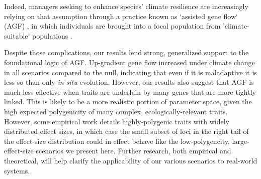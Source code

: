 \documentclass[9pt,twocolumn,twoside,lineno]{pnas-new}
\begin{document}
Indeed, managers seeking to enhance species' climate resilience
are increasingly relying on that assumption
through a practice known as `assisted gene flow` (AGF) \cite{aitken_whitlock},
in which individuals are brought into a focal population
from 'climate-suitable' populations \cite{bellis}.

Despite those complications, our results lend strong, generalized support to the foundational logic of AGF.
Up-gradient gene flow increased under climate change in all scenarios compared to the null,
indicating that even if it is maladaptive it is less so than only \textit{in situ} evolution.
However, our results also suggest that AGF is much less effective when traits
are underlain by many genes that are more tightly linked.
This is likely to be a more realistic portion of parameter space,
given the high expected polygenicity
of many complex, ecologically-relevant traits. However, some empirical work
details highly-polygenic traits with widely distributed effect sizes, in which case the small
subset of loci in the right tail of the effect-size distribution could in effect
behave like the low-polygencity, large-effect-size scenarios we present here.
Further research, both empirical and theoretical, will help clarify the
applicability of our various scenarios to real-world systems.
 
\end{document}
